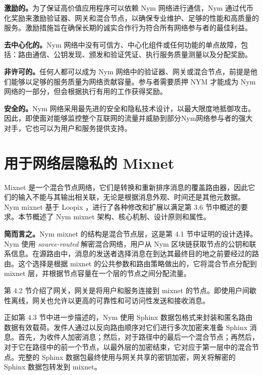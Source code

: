 \documentclass{article}
\begin{document}
	\textbf{激励的。}为了保证高价值应用程序可以依赖 Nym 网络进行通信，Nym 通过代币化奖励来激励验证器、网关和混合节点，以确保专业维护、足够的性能和高质量的服务。激励措施旨在确保长期的诚实合作行为符合所有网络参与者的最佳利益。\newline

	\textbf{去中心化的。}Nym 网络中没有可信方、中心化组件或任何功能的单点故障，包括：路由通信、公钥发现、颁发和验证凭证、执行服务质量测量以及分配奖励。\newline

	\textbf{非许可的。}任何人都可以成为 Nym 网络中的验证器、网关或混合节点，前提是他们能够以足够的服务质量为网络贡献容量。参与者需要质押 NYM 才能成为 Nym 网络的一部分，但会根据执行有用的工作获得奖励。\newline

	\textbf{安全的。}Nym 网络采用最先进的安全和隐私技术设计，以最大限度地抵御攻击。因此，即使面对能够监控整个互联网的流量并威胁到部分Nym网络参与者的强大对手，它也可以为用户和服务提供支持。\newline
	
	\section{用于网络层隐私的 Mixnet}

	Mixnet 是一个混合节点网络，它们是转换和重新排序消息的覆盖路由器，因此它们的输入不能与其输出相关联，无论是根据消息外观、时间还是其他元数据\cite{ref25}。Nym mixnet 基于 Loopix \cite{ref89}，进行了各种修改和扩展以满足第 3.6 节中概述的要求。本节概述了 Nym mixnet 架构、核心机制、设计原则和属性。\newline

	\textbf{简而言之。}Nym mixnet 的结构是混合节点层，这是第 4.1 节中证明的设计选择。Nym 使用 \emph{source-routed} 解密混合网络，用户从 Nym 区块链获取节点的公钥和联系信息。在源路由中，消息的发送者选择消息在到达其最终目的地之前要经过的路由。这个选择是根据 mixnet 的公共参数和路由策略做出的，它将混合节点分配到 mixnet 层，并根据节点容量在一个层的节点之间分配流量。\newline

	第 4.2 节介绍了网关，网关是将用户和服务连接到 mixnet 的节点。即使用户间歇性离线，网关也允许以更高的可靠性和可访问性发送和接收消息。\newline

	正如第 4.3 节中进一步描述的，Nym 使用 Sphinx \cite{ref29}数据包格式来封装和匿名路由数据有效载荷。发件人通过以反向路由顺序对它们进行多次加密来准备 Sphinx 消息。首先，为收件人加密消息；然后，对于路径中的最后一个混合节点；再然后，对于它在路径中的前一个节点，以最外层的加密结束，它对应于第一层中的混合节点。完整的 Sphinx 数据包最终使用与网关共享的密钥加密，网关将解密的 Sphinx 数据包转发到 mixnet。\newline
\end{document}
